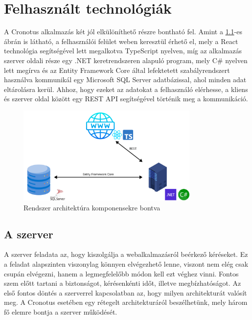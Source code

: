 \lstset{style=c_sharp}
\chapter{Felhasznált technológiák}


A Cronotus alkalmazás két jól elkülöníthető részre bontható fel. Amint a \ref{fig:architecture_overview}-es ábrán is látható, a felhasználói felület weben keresztül érhető el, mely a React\cite{reactdocs} technológia segítségével lett megalkotva TypeScript\cite{typescriptdocs} nyelven, míg az alkalmazás szerver oldali része egy .NET keretrendszeren\cite{dotnetnocs} alapuló program, mely C\# nyelven\cite{csharpdocs} lett megírva és az Entity Framework Core\cite{entityframeworkdocs} által lefektetett szabályrendszert használva kommunikál egy Microsoft SQL Server\cite{sqlserverdocs} adatbázissal, ahol minden adat eltárolásra kerül.
Ahhoz, hogy ezeket az adatokat a felhasználó elérhesse, a kliens és szerver oldal között egy REST API\cite{restfuldocs} segítségével történik meg a kommunikáció.

\begin{figure}[h]
    \centering
    \includegraphics[width=0.8\textwidth]{./images/cronotus_architecture_overview.png}
    \caption{Rendszer architektúra komponensekre bontva}
    \label{fig:architecture_overview}
\end{figure}


\section{A szerver}

A szerver feladata az, hogy kiszolgálja a webalkalmazásról beérkező kéréseket. Ez a feladat alapszinten viszonylag könnyen elvégezhető lenne, viszont nem elég csak csupán elvégezni, hanem a legmegfelelőbb módon kell ezt véghez vinni. Fontos szem előtt tartani a biztonságot, kérésenkénti időt, illetve megbízhatóságot. Az első fontos döntés a szerverrel kapcsolatban az, hogy milyen architekturát valósít meg. A Cronotus esetében egy rétegelt architekturáról\cite{onionarchitecturedocs} beszélhetünk, mely három fő elemre bontja a szerver működését.

